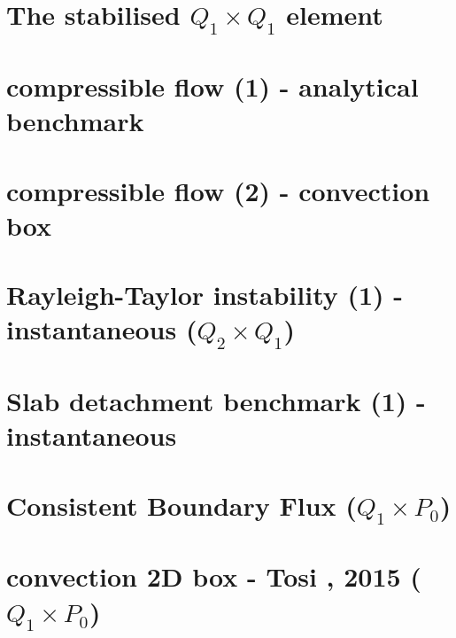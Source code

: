 \documentclass[a4paper,11pt]{report}
\begin{document}
\chapter{The stabilised $Q_1 \times Q_1$ element \label{f22}} %

\chapter{compressible flow (1) - analytical benchmark \label{f23}} %

\chapter{compressible flow (2) - convection box \label{f24}} %

\chapter{Rayleigh-Taylor instability (1) - instantaneous ($Q_2\times Q_1$)\label{f25}} %

\chapter{Slab detachment benchmark (1) - instantaneous \label{f26}} %

\chapter{Consistent Boundary Flux ($Q_1\times P_0$)\label{f27}} %

\chapter{convection 2D box - Tosi \etal, 2015 ($Q_1\times P_0$) \label{f28}} %
\end{document}
